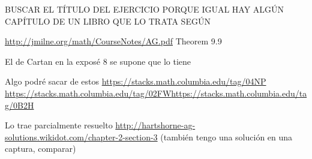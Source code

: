 \documentclass[twoside]{article}
\begin{document}
\begin{solucion}
\begin{enumerate}[(a)]
\end{enumerate}
BUSCAR EL TÍTULO DEL EJERCICIO PORQUE IGUAL HAY ALGÚN CAPÍTULO DE UN LIBRO QUE LO TRATA SEGÚN 

\url{http://jmilne.org/math/CourseNotes/AG.pdf} Theorem 9.9

El de Cartan en la exposé 8 se supone que lo tiene

Algo podré sacar de estos \url{https://stacks.math.columbia.edu/tag/04NP} \url{https://stacks.math.columbia.edu/tag/02FW}\url{https://stacks.math.columbia.edu/tag/0B2H}

Lo trae parcialmente resuelto \url{http://hartshorne-ag-solutions.wikidot.com/chapter-2-section-3} (también tengo una solución en una captura, comparar)



\end{solucion}
\end{document}

